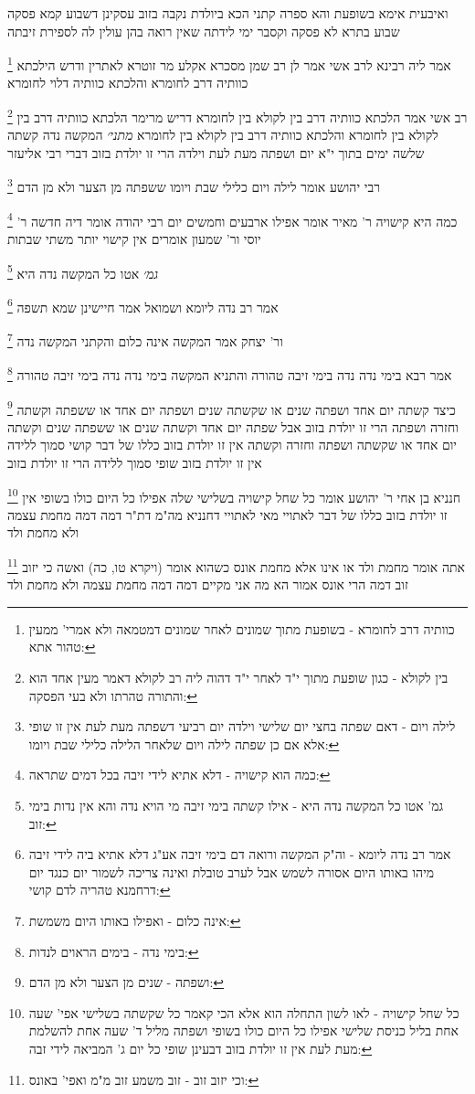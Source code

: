 \documentclass[12pt, openany]{book}
\newcommand{\footnotecomment}[1]{
	\renewcommand\thefootnote{}
	\footnote{#1}}
\newcommand{\commenta}[1]{\footnotecomment{#1}}
\begin{document}
{{ואיבעית אימא בשופעת והא ספרה קתני 
הכא ביולדת נקבה בזוב עסקינן דשבוע קמא פסקה שבוע בתרא לא פסקה וקסבר ימי לידתה שאין רואה בהן עולין לה לספירת זיבתה 
\commenta{כוותיה דרב לחומרא - בשופעת מתוך שמונים לאחר שמונים דמטמאה ולא אמרי' ממעין טהור אתא:}
אמר ליה רבינא לרב אשי אמר לן רב שמן מסכרא אקלע מר זוטרא לאתרין ודרש הילכתא כוותיה דרב לחומרא והלכתא כוותיה דלוי לחומרא 
\commenta{בין לקולא - כגון שופעת מתוך י"ד לאחר י"ד דהוה ליה רב לקולא דאמר מעין אחד הוא והתורה טהרתו ולא בעי הפסקה:}
רב אשי אמר הלכתא כוותיה דרב בין לקולא בין לחומרא דריש מרימר הלכתא כוותיה דרב בין לקולא בין לחומרא והלכתא כוותיה דרב בין לקולא בין לחומרא
{\large\emph{מתני׳}} המקשה נדה קשתה שלשה ימים בתוך י"א יום ושפתה מעת לעת וילדה הרי זו יולדת בזוב דברי רבי אליעזר 
\commenta{לילה ויום - דאם שפתה בחצי יום שלישי וילדה יום רביעי דשפתה מעת לעת אין זו שופי אלא אם כן שפתה לילה ויום שלאחר הלילה כלילי שבת ויומו:}
רבי יהושע אומר לילה ויום כלילי שבת ויומו ששפתה מן הצער ולא מן הדם 
\commenta{כמה הוא קישויה - דלא אתיא לידי זיבה בכל דמים שתראה:}
כמה היא קישויה ר' מאיר אומר אפילו ארבעים וחמשים יום רבי יהודה אומר דיה חדשה ר' יוסי ור' שמעון אומרים אין קישוי יותר משתי שבתות
\commenta{גמ' אטו כל המקשה נדה היא - אילו קשתה בימי זיבה מי הויא נדה והא אין נדות בימי זוב:}
{\large\emph{גמ׳}} אטו כל המקשה נדה היא
\commenta{אמר רב נדה ליומא - וה"ק המקשה ורואה דם בימי זיבה אע"ג דלא אתיא ביה לידי זיבה מיהו באותו היום אסורה לשמש אבל לערב טובלת ואינה צריכה לשמור יום כנגד יום דרחמנא טהריה לדם קושי:}
אמר רב נדה ליומא ושמואל אמר חיישינן שמא תשפה 
\commenta{אינה כלום - ואפילו באותו היום משמשת:}
ור' יצחק אמר המקשה אינה כלום והקתני המקשה נדה 
\commenta{בימי נדה - בימים הראוים לנדות:}
אמר רבא בימי נדה נדה בימי זיבה טהורה והתניא המקשה בימי נדה נדה בימי זיבה טהורה 
\commenta{ושפתה - שנים מן הצער ולא מן הדם:}
כיצד קשתה יום אחד ושפתה שנים או שקשתה שנים ושפתה יום אחד או ששפתה וקשתה וחזרה ושפתה הרי זו יולדת בזוב 
אבל שפתה יום אחד וקשתה שנים או ששפתה שנים וקשתה יום אחד או שקשתה ושפתה וחזרה וקשתה אין זו יולדת בזוב כללו של דבר קושי סמוך ללידה אין זו יולדת בזוב שופי סמוך ללידה הרי זו יולדת בזוב 
\commenta{כל שחל קישויה - לאו לשון התחלה הוא אלא הכי קאמר כל שקשתה בשלישי אפי' שעה אחת בליל כניסת שלישי אפילו כל היום כולו בשופי ושפתה מליל ד' שעה אחת להשלמת מעת לעת אין זו יולדת בזוב דבעינן שופי כל יום ג' המביאה לידי זבה:}
חנניא בן אחי ר' יהושע אומר כל שחל קישויה בשלישי שלה אפילו כל היום כולו בשופי אין זו יולדת בזוב 
כללו של דבר לאתויי מאי לאתויי דחנניא 
מה"מ דת"ר דמה דמה מחמת עצמה ולא מחמת ולד 
\commenta{וכי יזוב זוב - זוב משמע זוב מ"מ ואפי' באונס:}
אתה אומר מחמת ולד או אינו אלא מחמת אונס כשהוא אומר (ויקרא טו, כה) ואשה כי יזוב זוב דמה הרי אונס אמור הא מה אני מקיים דמה דמה מחמת עצמה ולא מחמת ולד 
}}
\end{document}
